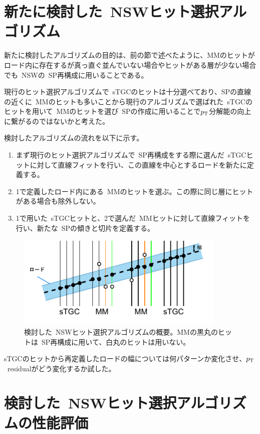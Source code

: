 \section{新たに検討した~NSWヒット選択アルゴリズム}\label{chapter5-4}
新たに検討したアルゴリズムの目的は、前の節で述べたように、MMのヒットがロード内に存在するが真っ直ぐ並んでいない場合やヒットがある層が少ない場合でも~NSWの~SP再構成に用いることである。

現行のヒット選択アルゴリズムで~sTGCのヒットは十分選べており、SPの直線の近くに~MMのヒットも多いことから現行のアルゴリズムで選ばれた~sTGCのヒットを用いて~MMのヒットを選び~SPの作成に用いることで$p_\mathrm{T}$分解能の向上に繋がるのではないかと考えた。


検討したアルゴリズムの流れを以下に示す。
\begin{enumerate}
    \item まず現行のヒット選択アルゴリズムで~SP再構成をする際に選んだ~sTGCヒットに対して直線フィットを行い、この直線を中心とするロードを新たに定義する。
    \item 1で定義したロード内にある~MMのヒットを選ぶ。この際に同じ層にヒットがある場合も除外しない。
    \item 1で用いた~sTGCヒットと、2で選んだ~MMヒットに対して直線フィットを行い、新たな~SPの傾きと切片を定義する。
\end{enumerate}


\begin{figure}[H]
    \centering
    \includegraphics[clip, width=10cm]{fig/5/newHitSelectAlg.pdf}
    \caption{検討した~NSWヒット選択アルゴリズムの概要。MMの黒丸のヒットは~SP再構成に用いて、白丸のヒットは用いない。}
    \label{fig:5-12}
\end{figure}

sTGCのヒットから再定義したロードの幅については何パターンか変化させ、$p_\mathrm{T}$~residualがどう変化するか試した。


\section{検討した~NSWヒット選択アルゴリズムの性能評価}\label{chapter5-5}
